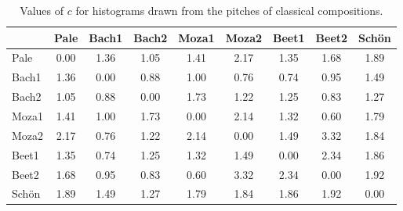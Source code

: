 \begin{table}[h!]
\begin{center}
\begin{tabular}{| l | c | c | c | c | c | c | c | c |}\hline
 & Pale & Bach1 & Bach2 & Moza1 & Moza2 & Beet1 & Beet2 & Sch\"on \\\hline
Pale & 0.00  & 1.36  & 1.05  & 1.41  & 2.17  & 1.35  & 1.68  & 1.89 \\\hline
Bach1 & 1.36  & 0.00  & 0.88  & 1.00  & 0.76  & 0.74  & 0.95  & 1.49 \\\hline
Bach2 & 1.05  & 0.88  & 0.00  & 1.73  & 1.22  & 1.25  & 0.83  & 1.27 \\\hline
Moza1 & 1.41  & 1.00  & 1.73  & 0.00  & 2.14  & 1.32  & 0.60  & 1.79 \\\hline
Moza2 & 2.17  & 0.76  & 1.22  & 2.14  & 0.00  & 1.49  & 3.32  & 1.84 \\\hline
Beet1 & 1.35  & 0.74  & 1.25  & 1.32  & 1.49  & 0.00  & 2.34  & 1.86 \\\hline
Beet2 & 1.68  & 0.95  & 0.83  & 0.60  & 3.32  & 2.34  & 0.00  & 1.92 \\\hline
Sch\"on & 1.89  & 1.49  & 1.27  & 1.79  & 1.84  & 1.86  & 1.92  & 0.00 \\\hline
\end{tabular}
\caption{Values of $c$ for histograms drawn from the pitches of classical compositions.}
\end{center}
\end{table}
